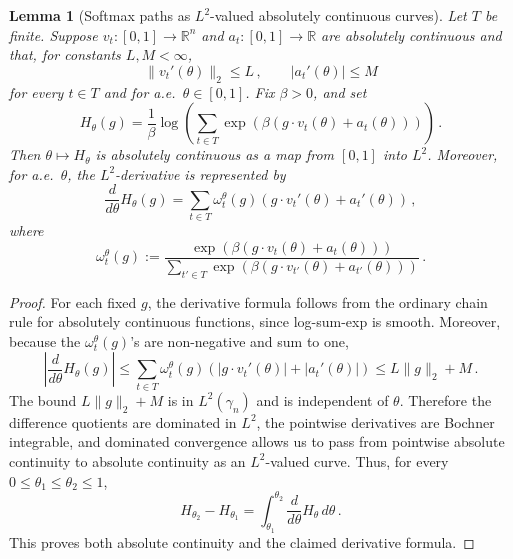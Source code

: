 \documentclass[10pt,a4paper]{amsart}
\newtheorem{lemma}{Lemma}
\newcommand{\R}{\mathbb{R}}
\newcommand{\pbra}[1]{{\left( #1 \right)}}
\newcommand{\vabs}[1]{{\left\| #1 \right\|}}
\begin{document}
\begin{lemma}[Softmax paths as $L^2$-valued absolutely continuous curves]
\label{lem:l2-chain}
	Let $T$ be finite.
	Suppose $v_t:[0,1]\to\R^n$ and $a_t:[0,1]\to\R$ are absolutely continuous and that, for constants $L,M<\infty$,
	\[
		\|v_t'(\theta)\|_2\leq  L\,,
		\qquad
		|a_t'(\theta)|\leq  M
	\]
	for every $t\in T$ and for a.e.~$\theta\in[0,1]$.
	Fix $\beta>0$, and set
	\[
		H_\theta(g)
		=
		\frac{1}{\beta}
		\log\pbra{
		\sum_{t\in T}
		\exp\pbra{\beta\pbra{g\cdot v_t(\theta)+a_t(\theta)}}
		}\,.
	\]
	Then $\theta\mapsto H_\theta$ is absolutely continuous as a map from $[0,1]$ into $L^2$.
	Moreover, for a.e.~$\theta$, the $L^2$-derivative is represented by
	\[
		\frac{d}{d\theta}H_\theta(g)
		=
		\sum_{t\in T}
		\omega_t^\theta(g)
		\pbra{
		g\cdot v_t'(\theta)
		+
		a_t'(\theta)
		}\,,
	\]
	where
	\[
		\omega_t^\theta(g)
		:=
		\frac{
		\exp\left(\beta(g\cdot v_t(\theta)+a_t(\theta))\right)
		}{
		\sum_{t'\in T}
		\exp\left(\beta(g\cdot v_{t'}(\theta)+a_{t'}(\theta))\right)
		}\,.
	\]
\end{lemma}

\begin{proof}
	For each fixed $g$, the derivative formula follows from the ordinary chain rule for absolutely continuous functions, since log-sum-exp is smooth.
	Moreover, because the $\omega_t^\theta(g)$'s are non-negative and sum to one,
	\[
		\left|
		\frac{d}{d\theta}H_\theta(g)
		\right|
		\leq 
		\sum_{t\in T}
		\omega_t^\theta(g)
		\pbra{|g\cdot v_t'(\theta)|+|a_t'(\theta)|}
		\leq 
		L\|g\|_2+M\,.
	\]
	The bound $L\|g\|_2+M$ is in $L^2(\gamma_n)$ and is independent of $\theta$. 
	Therefore the difference quotients are dominated in $L^2$, the pointwise derivatives are Bochner integrable, and dominated convergence allows us to pass from pointwise absolute continuity to absolute continuity as an $L^2$-valued curve. 
	Thus, for every $0\leq \theta_1\leq \theta_2\leq 1$,
	\[
		H_{\theta_2}-H_{\theta_1}
		=
		\int_{\theta_1}^{\theta_2}
		\frac{d}{d\theta}H_\theta\,d\theta\,.
	\]
	This proves both absolute continuity and the claimed derivative formula. 
\end{proof}
\end{document}

